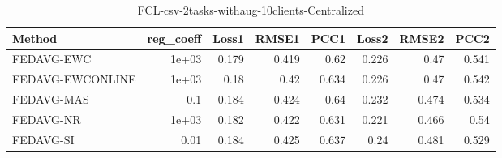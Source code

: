 \begin{table}
\caption{FCL-csv-2tasks-withaug-10clients-Centralized}
\begin{tabular}{lrrrrrrr}
\toprule
Method & reg_coeff & Loss1 & RMSE1 & PCC1 & Loss2 & RMSE2 & PCC2 \\
\midrule
FEDAVG-EWC & 1e+03 & 0.179 & 0.419 & 0.62 & 0.226 & 0.47 & 0.541 \\
FEDAVG-EWCONLINE & 1e+03 & 0.18 & 0.42 & 0.634 & 0.226 & 0.47 & 0.542 \\
FEDAVG-MAS & 0.1 & 0.184 & 0.424 & 0.64 & 0.232 & 0.474 & 0.534 \\
FEDAVG-NR & 1e+03 & 0.182 & 0.422 & 0.631 & 0.221 & 0.466 & 0.54 \\
FEDAVG-SI & 0.01 & 0.184 & 0.425 & 0.637 & 0.24 & 0.481 & 0.529 \\
\bottomrule
\end{tabular}
\end{table}

